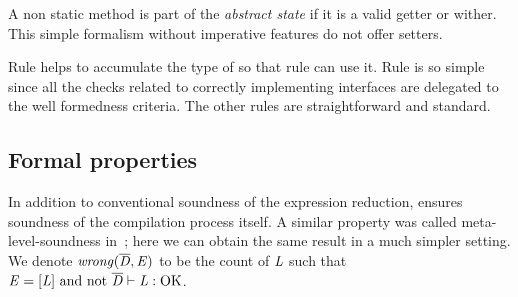 \noindent A non static method is part of the \emph{abstract state} if 
it is a valid getter or wither. This simple formalism without imperative features do not offer setters.


Rule  helps to accumulate the type of \Q@this@ so that rule 
can use it.
Rule  is so simple since all the checks
related to correctly implementing interfaces are delegated to the well formedness criteria.
The other rules are straightforward and standard.

\saveSpace
\subsection{Formal properties}
\saveSpace
In addition to conventional soundness of the expression reduction,
\name ensures soundness of the compilation process itself.
A similar property was called meta-level-soundness in~\cite{servetto2014meta}; here we can obtain the same result in
a much simpler setting.
We denote $\mathit{wrong}(\overline{\mathit{D}},\mathit{E})$ to be the count of $\mathit{L}$ such that
$\mE=\ctx[\mL]\ \text{and not}\ \overline\mD\vdash\mL:\text{OK}$.

